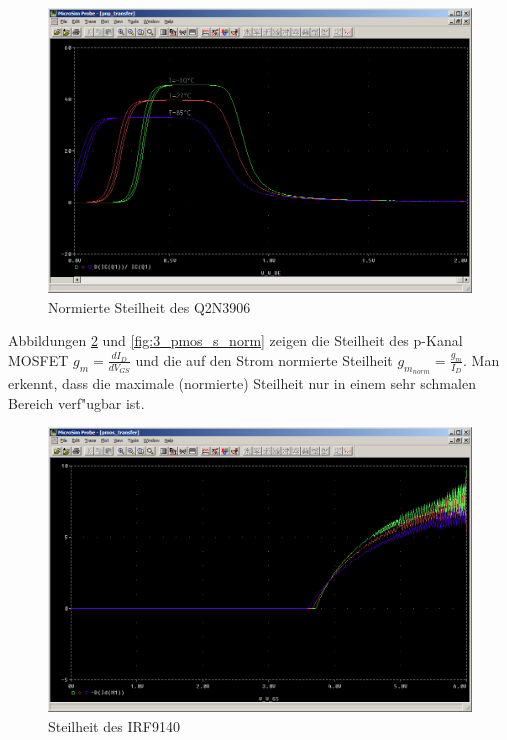 \begin{figure}%
	\centering
	\includegraphics[width=\textwidth]{fig/ue2_ex3_pnp_s_norm.PNG}
	\caption{Normierte Steilheit des Q2N3906}
	\label{fig:3_pnp_s_norm}
\end{figure}

Abbildungen \ref{fig:3_pmos_s} und \ref{fig:3_pmos_s_norm} zeigen die Steilheit des p-Kanal MOSFET $g_m = \frac{dI_D}{dV_{GS}}$ und die auf den Strom normierte Steilheit $g_{m_{norm}} = \frac{g_m}{I_D}$. Man erkennt, dass die maximale (normierte) Steilheit nur in einem sehr schmalen Bereich verf"ugbar ist.

\begin{figure}%
	\centering
	\includegraphics[width=\textwidth]{fig/ue2_ex3_pmos_s.PNG}
	\caption{Steilheit des IRF9140}
	\label{fig:3_pmos_s}
\end{figure}

